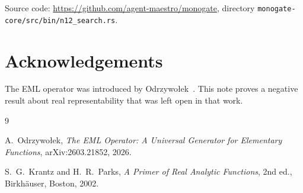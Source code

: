 \documentclass[11pt,a4paper]{amsart}
\begin{document}
Source code: \url{https://github.com/agent-maestro/monogate},
directory \texttt{monogate-core/src/bin/n12\_search.rs}.

\section*{Acknowledgements}

The EML operator was introduced by Odrzywołek~\cite{odzryzwolek2026eml}.
This note proves a negative result about real representability that was left
open in that work.

\begin{thebibliography}{9}

A.~Odrzywołek,
\emph{The EML Operator: A Universal Generator for Elementary Functions},
arXiv:2603.21852, 2026.

S.~G.~Krantz and H.~R.~Parks,
\emph{A Primer of Real Analytic Functions}, 2nd ed.,
Birkh\"{a}user, Boston, 2002.

\end{thebibliography}
\end{document}
